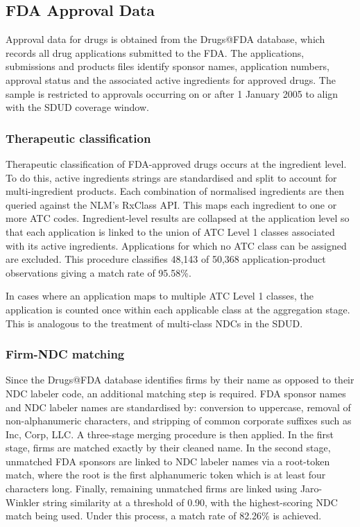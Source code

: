 \documentclass[12pt]{article}
\begin{document}
\subsection{FDA Approval Data}
\label{sec:fda}

Approval data for drugs is obtained from the Drugs@FDA database, which records all drug applications submitted to the FDA. The applications, submissions and products files identify sponsor names, application numbers, approval status and the associated active ingredients for approved drugs. The sample is restricted to approvals occurring on or after 1 January 2005 to align with the SDUD coverage window.

\subsubsection{Therapeutic classification}

Therapeutic classification of FDA-approved drugs occurs at the ingredient level. To do this, active ingredients strings are standardised and split to account for multi-ingredient products. Each combination of normalised ingredients are then queried against the NLM's RxClass API. This maps each ingredient to one or more ATC codes. Ingredient-level results are collapsed at the application level so that each application is linked to the union of ATC Level 1 classes associated with its active ingredients. Applications for which no ATC class can be assigned are excluded. This procedure classifies 48,143 of 50,368 application-product observations giving a match rate of 95.58\%.

In cases where an application maps to multiple ATC Level 1 classes, the application is counted once within each applicable class at the aggregation stage. This is analogous to the treatment of multi-class NDCs in the SDUD.

\subsubsection{Firm-NDC matching}

Since the Drugs@FDA database identifies firms by their name as opposed to their NDC labeler code, an additional matching step is required. FDA sponsor names and NDC labeler names are standardised by: conversion to uppercase, removal of non-alphanumeric characters, and stripping of common corporate suffixes such as Inc, Corp, LLC. A three-stage merging procedure is then applied. In the first stage, firms are matched exactly by their cleaned name. In the second stage, unmatched FDA sponsors are linked to NDC labeler names via a root-token match, where the root is the first alphanumeric token which is at least four characters long. Finally, remaining unmatched firms are linked using Jaro-Winkler string similarity at a threshold of 0.90, with the highest-scoring NDC match being used. Under this process, a match rate of 82.26\% is achieved.
\end{document}
